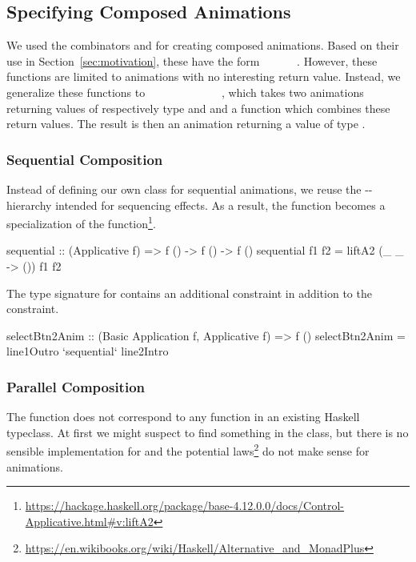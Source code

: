 \subsection{Specifying Composed Animations}

We used the combinators  and  for creating composed animations. Based on their use in Section~\ref{sec:motivation}, these have the form ~\hs{()}~\hs{->}~~\hs{->}~~\hs{()}. However, these functions are limited to animations with no interesting return value. Instead, we generalize these functions to \hs{(}~\hs{->}~~\hs{->}~\hs{)}~\hs{->}~~~\hs{->}~~~\hs{->}~~, which takes two animations returning values of respectively type  and  and a function which combines these return values. The result is then an animation returning a value of type .

\subsubsection{Sequential Composition}

Instead of defining our own class for sequential animations, we reuse the -- hierarchy intended for sequencing effects. As a result, the  function becomes a specialization of the  function\footnote{\url{https://hackage.haskell.org/package/base-4.12.0.0/docs/Control-Applicative.html#v:liftA2}}.

\begin{code}
sequential :: (Applicative f) => f () -> f () -> f ()
sequential f1 f2 = liftA2 (\_ _ -> ()) f1 f2
\end{code}

The type signature for  contains an additional  constraint in addition to the  constraint.

\begin{code}
selectBtn2Anim :: (Basic Application f, Applicative f) => f ()
selectBtn2Anim = line1Outro `sequential` line2Intro
\end{code}

\subsubsection{Parallel Composition}

The  function does not correspond to any function in an existing Haskell typeclass. At first we might suspect to find something in the  class, but there is no sensible implementation for  and the potential laws\footnote{\url{https://en.wikibooks.org/wiki/Haskell/Alternative_and_MonadPlus}} do not make sense for animations.

